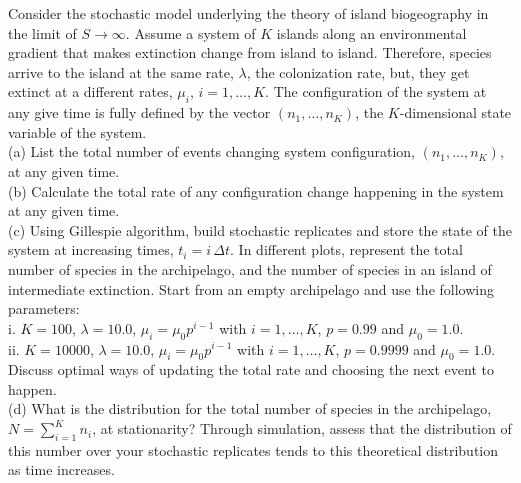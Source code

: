 \documentclass{article}
\newenvironment{problem}[2][Problem]{\begin{trivlist}
\item[\hskip \labelsep {\bfseries #1}\hskip \labelsep {\bfseries #2.}]}{\end{trivlist}}
\begin{document}
\begin{problem}{2}
Consider the stochastic model underlying the theory of island biogeography in the limit of  $S \rightarrow \infty$. Assume a system of $K$ islands along an environmental gradient that makes extinction change from island to island. Therefore, species arrive to the island at the same rate, $\lambda$, the colonization rate, but, they get extinct at a different rates, $\mu_i$, $i=1, \dots, K$. The configuration of the system at any give time is fully defined by the vector $(n_1, \dots, n_K)$, the $K$-dimensional state variable of the system.\\
(a) List the total number of events changing system configuration, $(n_1, \dots, n_K)$, at any given time. \\
(b) Calculate the total rate of any configuration change happening in the system at any given time.\\ 
(c) Using Gillespie algorithm, build stochastic replicates and store the state of the system at increasing times, $t_i= i\,\Delta t$. In different plots, represent the total number of species in the archipelago, and the number of species in an island of intermediate extinction. Start from an empty archipelago and use the following parameters:\\
i. $K=100$, $\lambda = 10.0$, $\mu_i = \mu_0 p^{i-1}$ with $i=1, \dots, K$, $p = 0.99$ and $\mu_0 = 1.0$.\\
ii. $K=10000$, $\lambda = 10.0$, $\mu_i = \mu_0 p^{i-1}$ with $i=1, \dots, K$, $p = 0.9999$ and $\mu_0 = 1.0$. Discuss optimal ways of updating the total rate and choosing the next event to happen. \\
(d) What is the distribution for the total number of species in the archipelago, $N = \sum_{i=1}^K n_i$, at stationarity? Through simulation, assess that the distribution of this number over your stochastic replicates tends to this theoretical distribution as time increases.  
\end{problem}
\end{document}
